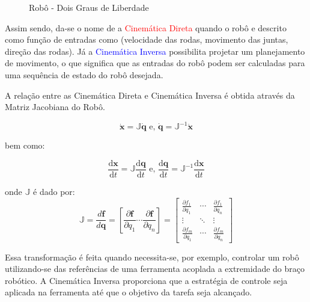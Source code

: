 \begin{figure}[!ht]

\caption{Robô - Dois Graus de Liberdade}
\label{fig:2dof-robot}
\end{figure}

Assim sendo, da-se o nome de a \textcolor{red}{Cinemática Direta} quando o robô e descrito como função de entradas como (velocidade das rodas, movimento das juntas, direção das rodas).  Já a \textcolor{blue}{Cinemática Inversa} possibilita projetar um planejamento de movimento, o que significa que as entradas do robô podem ser calculadas para uma sequência de estado do robô desejada.

A relação entre as Cinemática Direta e Cinemática Inversa é obtida através da Matriz Jacobiana do Robô.

\begin{equation*}
    \mathbf{\dot{x}} = \mathbb{J}{\mathbf{\dot{q}}}
    \text{ e, }
    \mathbf{\dot{q}} = \mathbb{J}^{-1}{\mathbf{\dot{x}}}
\end{equation*}

bem como:

\begin{equation*}
    \frac{\text{d}\mathbf{x}}{\text{d}t} = \mathbb{J}\frac{\text{d}\mathbf{q}}{\text{d}t}
    \text{ e, }
    \frac{\text{d}\mathbf{q}}{\text{d}t} = \mathbb{J}^{-1}\frac{\text{d}\mathbf{x}}{\text{d}t}
\end{equation*}

onde $\mathbb{J}$ é dado por:
\begin{equation*}
    \mathbb{J}
    =
    \frac{d \mathbf{f}}{d \mathbf{q}}
    =
    \left[ \frac{\partial \mathbf{f}}{\partial q_1}
        \cdots \frac{\partial \mathbf{f}}{\partial q_n} \right]
    =
    \begin{bmatrix}
        \frac{\partial f_1}{\partial q_1} & \cdots &
        \frac{\partial f_1}{\partial q_n}                   \\
        \vdots                            & \ddots & \vdots \\
        \frac{\partial f_m}{\partial q_1} & \cdots &
        \frac{\partial f_m}{\partial q_n}
    \end{bmatrix}
\end{equation*}

Essa transformação é feita quando necessita-se, por exemplo, controlar um robô utilizando-se das referências de uma ferramenta acoplada a
extremidade do braço robótico. A Cinemática Inversa proporciona que a estratégia de controle seja aplicada na ferramenta até
que o objetivo da tarefa seja alcançado.


